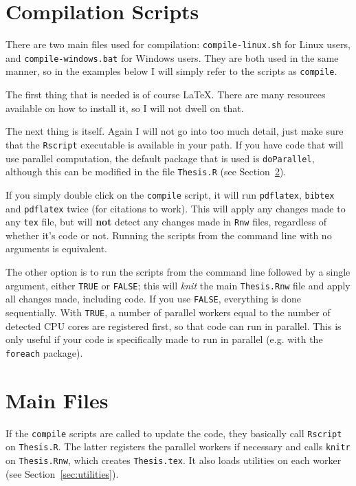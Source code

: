 \section{Compilation Scripts}
\label{sec:comp-scripts}

There are two main files used for compilation: \texttt{compile-linux.sh} for Linux users, and \texttt{compile-windows.bat} for Windows users. They are both used in the same manner, so in the examples below I will simply refer to the scripts as \texttt{compile}.

The first thing that is needed is of course \LaTeX{}. There are many resources available on how to install it, so I will not dwell on that.

The next thing is \R{} itself. Again I will not go into too much detail, just make sure that the \texttt{Rscript} executable is available in your path. If you have code that will use parallel computation, the default \R{} package that is used is \texttt{doParallel}, although this can be modified in the file \texttt{Thesis.R} (see Section~\ref{sec:main-files}).

If you simply double click on the \texttt{compile} script, it will run \texttt{pdflatex}, \texttt{bibtex} and \texttt{pdflatex} twice (for citations to work). This will apply any changes made to any \texttt{tex} file, but will \textbf{not} detect any changes made in \texttt{Rnw} files, regardless of whether it's \R{} code or not. Running the scripts from the command line with no arguments is equivalent.

The other option is to run the scripts from the command line followed by a single argument, either \texttt{TRUE} or \texttt{FALSE}; this will \textit{knit} the main \texttt{Thesis.Rnw} file and apply all changes made, including \R{} code. If you use \texttt{FALSE}, everything is done sequentially. With \texttt{TRUE}, a number of parallel workers equal to the number of detected CPU cores are registered first, so that \R{} code can run in parallel. This is only useful if your code is specifically made to run in parallel (e.g. with the \texttt{foreach} package).

\section{Main Files}
\label{sec:main-files}

If the \texttt{compile} scripts are called to update the \R{} code, they basically call \texttt{Rscript} on \texttt{Thesis.R}. The latter registers the parallel workers if necessary and calls \texttt{knitr} on \texttt{Thesis.Rnw}, which creates \texttt{Thesis.tex}. It also loads \R{} utilities on each worker (see Section~\ref{sec:utilities}).

